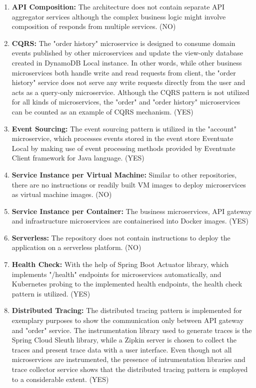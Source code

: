 \documentclass{Configuration_Files/PoliMi3i_thesis}
\begin{document}
\begin{enumerate}
    \item \textbf{API Composition:} The architecture does not contain separate API aggregator services although the complex business logic might involve composition of responds from multiple services. (NO)
    
    \item \textbf{CQRS:} The "order history" microservice is designed to consume domain events published by other microservices and update the view-only database created in DynamoDB Local instance.
    In other words, while other business microservices both handle write and read requests from client, the "order history" service does not serve any write requests directly from the user and acts as a query-only microservice.
    Although the CQRS pattern is not utilized for all kinds of microservices, the "order" and "order history" microservices can be counted as an example of CQRS mechanism. (YES)
    
    \item \textbf{Event Sourcing:} The event sourcing pattern is utilized in the "account" microservice, which processes events stored in the event store Eventuate Local by making use of event processing methods provided by Eventuate Client framework for Java language. (YES)
    
    \item \textbf{Service Instance per Virtual Machine:} Similar to other repositories, there are no instructions or readily built VM images to deploy microservices as virtual machine images. (NO)
    
    \item \textbf{Service Instance per Container:} The business microservices, API gateway and infrastructure microservices are containerised into Docker images. (YES)
    
    \item \textbf{Serverless:} The repository does not contain instructions to deploy the application on a serverless platform. (NO)
    
    \item \textbf{Health Check:} With the help of Spring Boot Actuator library, which implements "/health" endpoints for microservices automatically, and Kubernetes probing to the implemented health endpoints, the health check pattern is utilized. (YES)
    
    \item \textbf{Distributed Tracing:} The distributed tracing pattern is implemented for exemplary purposes to show the communication only between API gateway and "order" service.
    The instrumentation library used to generate traces is the Spring Cloud Sleuth library, while a Zipkin server is chosen to collect the traces and present trace data with a user interface.
    Even though not all microservices are instrumented, the presence of intrumentation libraries and trace collector service shows that the distributed tracing pattern is employed to a considerable extent. (YES)
    

\end{enumerate}
\end{document}
